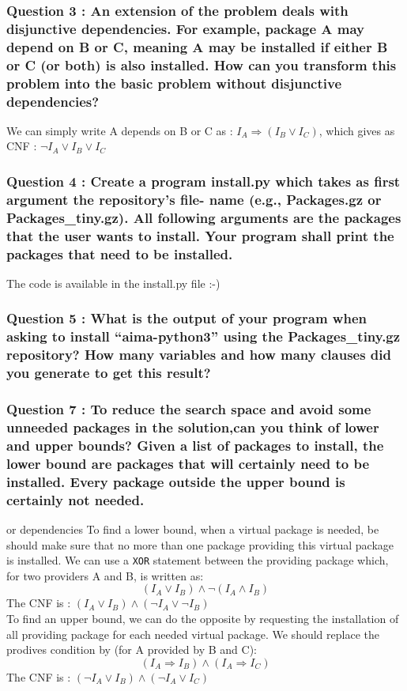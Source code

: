 \documentclass[a4paper,10pt]{article}
\begin{document}
\subsubsection{Question 3 : An extension of the problem deals with disjunctive dependencies. For example, package A may depend on B or C, meaning A may be installed if either B or C (or both) is also installed. How can you transform this problem into the basic problem without disjunctive dependencies?}
We can simply write A depends on B or C as : $I_{A} \Rightarrow (I_{B} \vee I_{C})$, which gives as CNF : $\neg I_{A} \vee I_{B} \vee I_{C}$

\subsubsection{Question 4 : Create a program install.py which takes as first argument the repository’s file- name (e.g., Packages.gz or Packages\_tiny.gz). All following arguments are the packages that the user wants to install. Your program shall print the packages that need to be installed.}
The code is available in the install.py file :-)

\subsubsection{Question 5 : What is the output of your program when asking to install “aima-python3” using the Packages\_tiny.gz repository? How many variables and how many clauses did you generate to get this result?}

\subsubsection{Question 7 : To reduce the search space and avoid some unneeded packages in the solution,can you think of lower and upper bounds? Given a list of packages to install, the lower bound are packages that will certainly need to be installed. Every package outside the upper bound is certainly not needed.}
{\huge or dependencies}
To find a lower bound, when a virtual package is needed, be should make sure that no more than one package providing this virtual package is installed. We can use a \texttt{XOR} statement between the providing package which, for two providers A and B, is written as:
$$(I_{A} \vee I_{B}) \wedge \neg (I_{A} \wedge I_{B})$$
The CNF is : $(I_{A} \vee I_{B}) \wedge (\neg I_{A} \vee \neg I_{B})$\\
To find an upper bound, we can do the opposite by requesting the installation of all providing package for each needed virtual package. We should replace the prodives condition by (for A provided by B and C): 
$$(I_{A} \Rightarrow I_{B}) \wedge (I_{A} \Rightarrow I_{C})$$ 
The CNF is : $(\neg I_{A} \vee I_{B}) \wedge (\neg I_{A} \vee I_{C})$
\end{document}
